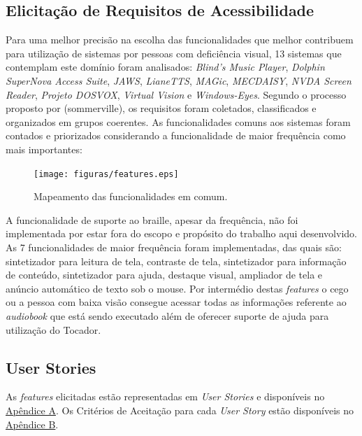 \subsection{Elicitação de Requisitos de Acessibilidade}


Para uma melhor precisão na escolha das funcionalidades que melhor contribuem para utilização de sistemas por pessoas com deficiência visual, 13 sistemas que contemplam este domínio foram analisados: \textit{Blind’s Music Player}, \textit{Dolphin SuperNova Access Suite}, \textit{JAWS}, \textit{LianeTTS}, \textit{MAGic}, \textit{MECDAISY}, \textit{NVDA Screen Reader}, \textit{Projeto DOSVOX}, \textit{Virtual Vision} e \textit{Windows-Eyes}. Segundo o processo proposto por (sommerville), os requisitos foram coletados, classificados e organizados em grupos coerentes. As funcionalidades comuns aos sistemas foram contados e priorizados considerando a funcionalidade de maior frequência como mais importantes:

\begin{figure}[ht]
	\centering
		\texttt{[image: figuras/features.eps]}
	\caption{Mapeamento das funcionalidades em comum.}
	\label{features}
\end{figure}

A funcionalidade de suporte ao braille, apesar da frequência, não foi implementada por estar fora do escopo e propósito do trabalho aqui desenvolvido. As 7 funcionalidades de maior frequência foram implementadas, das quais são: sintetizador para leitura de tela, contraste de tela, sintetizador para informação de conteúdo, sintetizador para ajuda, destaque visual, ampliador de tela e anúncio automático de texto sob o mouse. Por intermédio destas \textit{features} o cego ou a pessoa com baixa visão consegue acessar todas as informações referente ao \textit{audiobook} que está sendo executado além de oferecer suporte de ajuda para utilização do Tocador.

\subsection{User Stories}

As \textit{features} elicitadas estão representadas em \textit{User Stories} e disponíveis no \hyperref[userstories]{Apêndice A}. Os Critérios de Aceitação para cada \textit{User Story} estão disponíveis no \hyperref[criterios]{Apêndice B}.

